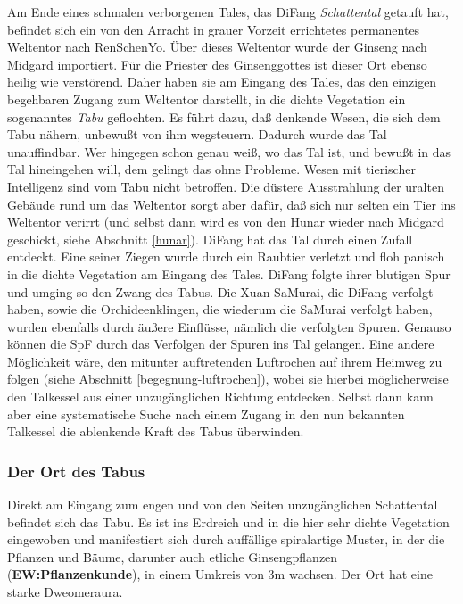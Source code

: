 \documentclass[
a4paper,
twoside,
DIV=calc,
BCOR=4mm,
fontsize=9pt,
twocolumn=on,
titlepage=on,
parskip=half
]{scrartcl}
\begin{document}
Am Ende eines schmalen verborgenen Tales, das DiFang
\emph{Schattental} getauft hat, befindet sich ein von den Arracht in
grauer Vorzeit errichtetes permanentes Weltentor nach RenSchenYo. Über
dieses Weltentor wurde der Ginseng nach Midgard importiert. Für die
Priester des Ginsenggottes ist dieser Ort ebenso heilig wie
verstörend. Daher haben sie am Eingang des Tales, das den einzigen
begehbaren Zugang zum Weltentor darstellt, in die dichte Vegetation
ein sogenanntes \emph{Tabu} geflochten. Es führt dazu, daß denkende
Wesen, die sich dem Tabu nähern, unbewußt von ihm wegsteuern. Dadurch
wurde das Tal unauffindbar. Wer hingegen schon genau weiß, wo das Tal
ist, und bewußt in das Tal hineingehen will, dem gelingt das ohne
Probleme. Wesen mit tierischer Intelligenz sind vom Tabu nicht
betroffen. Die düstere Ausstrahlung der uralten Gebäude rund um das
Weltentor sorgt aber dafür, daß sich nur selten ein Tier ins Weltentor
verirrt (und selbst dann wird es von den Hunar wieder nach Midgard
geschickt, siehe Abschnitt \ref{hunar}). DiFang hat das Tal durch
einen Zufall entdeckt. Eine seiner Ziegen wurde durch ein Raubtier
verletzt und floh panisch in die dichte Vegetation am Eingang des
Tales. DiFang folgte ihrer blutigen Spur und umging so den Zwang des
Tabus. Die Xuan-SaMurai, die DiFang verfolgt haben, sowie die
Orchideenklingen, die wiederum die SaMurai verfolgt haben, wurden
ebenfalls durch äußere Einflüsse, nämlich die verfolgten
Spuren. Genauso können die SpF durch das Verfolgen der Spuren ins Tal
gelangen. Eine andere Möglichkeit wäre, den mitunter auftretenden
Luftrochen auf ihrem Heimweg zu folgen (siehe Abschnitt
\ref{begegnung-luftrochen}), wobei sie hierbei möglicherweise den
Talkessel aus einer unzugänglichen Richtung entdecken. Selbst dann
kann aber eine systematische Suche nach einem Zugang in den nun
bekannten Talkessel die ablenkende Kraft des Tabus überwinden.

\subsubsection{Der Ort des Tabus}

Direkt am Eingang zum engen und von den Seiten unzugänglichen
Schattental befindet sich das Tabu. Es ist ins Erdreich und in die
hier sehr dichte Vegetation eingewoben und manifestiert sich durch
auffällige spiralartige Muster, in der die Pflanzen und Bäume,
darunter auch etliche Ginsengpflanzen (\textbf{EW:Pflanzenkunde}), in
einem Umkreis von 3m wachsen. Der Ort hat eine starke Dweomeraura.
\end{document}
